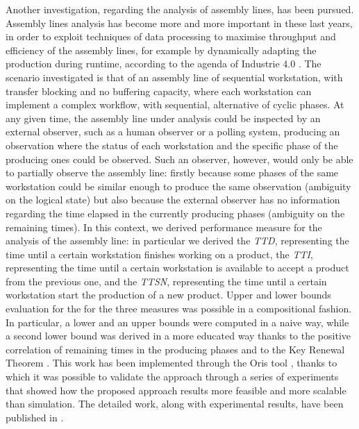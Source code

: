   Another investigation, regarding the analysis of assembly lines, has been pursued. Assembly lines analysis has become more and more important in these last years, in order to exploit techniques of data processing to maximise throughput and efficiency of the assembly lines, for example by dynamically adapting the production during runtime, according to the agenda of Industrie 4.0 \cite{hermann2016design}. The scenario investigated is that of an assembly line of sequential workstation, with transfer blocking and no buffering capacity, where each workstation can implement a complex workflow, with sequential, alternative of cyclic phases. At any given time, the assembly line under analysis could be inspected by an external observer, such as a human observer or a polling system, producing an observation where the status of each workstation and the specific phase of the producing ones could be observed. Such an observer, however, would only be able to partially observe the assembly line: firstly because some phases of the same workstation could be similar enough to produce the same observation (ambiguity on the logical state) but also because the external observer has no information regarding the time elapsed in the currently producing phases (ambiguity on the remaining times). In this context, we derived performance measure for the analysis of the assembly line: in particular we derived the \textit{\ac{TTD}}, representing the time until a certain workstation finishes working on a product, the \textit{\ac{TTI}}, representing the time until a certain workstation is available to accept a product from the previous one, and the \textit{\ac{TTSN}}, representing the time until a certain workstation start the production of a new product. Upper and lower bounds evaluation for the  for the three measures was possible in a compositional fashion. In particular, a lower and an upper bounds were computed in a naive way, while a second lower bound was derived in a more educated way thanks to the positive correlation of remaining times in the producing phases and to the Key Renewal Theorem \cite{serfozo2009basics}. This work has been implemented through the Oris tool , thanks to which it was possible to validate the approach through a series of experiments that showed how the proposed approach results more feasible and more scalable than simulation. The detailed work, along with experimental results, have been published in \cite{biagi2017inspection}.
  
